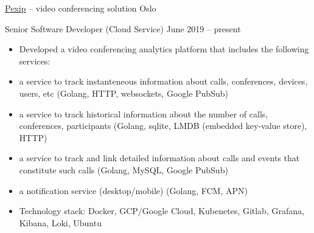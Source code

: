 \documentclass[unicode, 10pt, a4paper, oneside, fleqn]{article}
\begin{document}
\job  %
    {\href{http://www.pexip.com}{Pexip} -- video conferencing solution}
    {Oslo}
    {
        \position  %
        {Senior Software Developer (Cloud Service)}
        {June 2019 -- present}
        {
            \begin{itemize}
                \item{Developed a video conferencing analytics platform that
                    includes the following services:}
                \item{a service to track instanteneous information about calls,
                    conferences, devices, users, etc (Golang, HTTP, websockets, Google PubSub)}
                \item{a service to track historical information about the number
                    of calls, conferences, participants (Golang, sqlite, LMDB
                    (embedded key-value store), HTTP)}
                \item{a service to track and link detailed information about
                    calls and events that constitute such calls (Golang, MySQL, Google PubSub)}
                \item{a notification service (desktop/mobile) (Golang, FCM, APN)}
                \item{Technology stack: Docker, GCP/Google Cloud, Kubenetes,
                    Gitlab, Grafana, Kibana, Loki, Ubuntu}
            \end{itemize}
        }
    }
\end{document}
